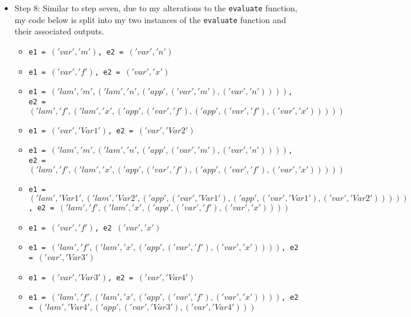 \documentclass{article}
\theoremstyle{theorem}
\theoremstyle{definition}
\theoremstyle{remark}
\begin{document}
\begin{itemize}
\begin{itemize}
        \item \texttt{$('lam', 'Var3', ('app', ('lam', 'f', ('lam', 'x', ('app', ('var', 'f'), ('app', ('var', 'f'), ('app', ('var', 'f'), ('var', 'x')))))), \newline ('app', ('lam', 'f', ('lam', 'x', ('app', ('var', 'f'), ('app', ('var', 'f'), ('app', ('var', 'f'), ('var', 'x')))))), \newline ('var', 'Var3'))))$}
        \item \texttt{Result: $(\lambda Var3.(\lambda Var5.(Var3 (Var3 (Var3 (Var3 (Var3 (Var3 (Var3 (Var3 (Var3\; Var5)))))))))))$}
        \end{itemize}
  \item Step 8: Similar to step seven, due to my alterations to the \texttt{evaluate} function, my code below is split into my two instances of the \texttt{evaluate} function and their associated outputs.
        \begin{itemize}
        \item \texttt{e1 = $('var', 'm')$, e2 = $('var', 'n')$}
        \item \texttt{e1 = $('var', 'f')$, e2 = $('var', 'x')$}
        \item \texttt{e1 = $('lam', 'm', ('lam', 'n', ('app', ('var', 'm'), ('var', 'n'))))$, \newline e2 = $('lam', 'f', ('lam', 'x', ('app', ('var', 'f'), ('app', ('var', 'f'), ('var', 'x')))))$}
        \item \texttt{e1 = $('var', 'Var1')$, e2 = $('var', 'Var2')$}
        \item \texttt{e1 = $('lam', 'm', ('lam', 'n', ('app', ('var', 'm'), ('var', 'n'))))$, \newline e2 = $('lam', 'f', ('lam', 'x', ('app', ('var', 'f'), ('app', ('var', 'f'), ('var', 'x')))))$}
        \item \texttt{e1 = $('lam', 'Var1', ('lam', 'Var2', ('app', ('var', 'Var1'), ('app', ('var', 'Var1'), ('var', 'Var2')))))$, \newline e2 = $('lam', 'f', ('lam', 'x', ('app', ('var', 'f'), ('var', 'x'))))$}
        \item \texttt{e1 = $('var', 'f')$, e2 $('var', 'x')$}
        \item \texttt{e1 = $('lam', 'f', ('lam', 'x', ('app', ('var', 'f'), ('var', 'x'))))$, e2 = $('var', 'Var3')$}
        \item \texttt{e1 = $('var', 'Var3')$, e2 = $('var', 'Var4')$}
        \item \texttt{e1 = $('lam', 'f', ('lam', 'x', ('app', ('var', 'f'), ('var', 'x'))))$, \newline e2 = $('lam', 'Var4', ('app', ('var', 'Var3'), ('var', 'Var4')))$}

\end{itemize}
\end{itemize}
\end{document}
